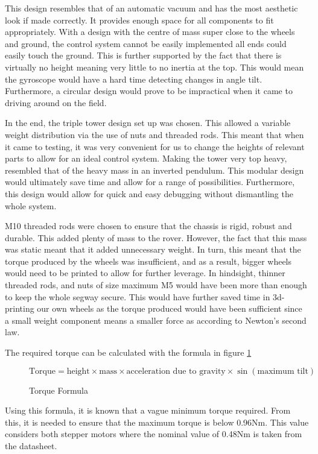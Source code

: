 
This design resembles that of an automatic vacuum and has the most aesthetic look if made correctly. It provides enough space for all components to fit appropriately. With a design with the centre of mass super close to the wheels and ground, the control system cannot be easily implemented all ends could easily touch the ground. This is further supported by the fact that there is virtually no height meaning very little to no inertia at the top. This would mean the gyroscope would have a hard time detecting changes in angle tilt. Furthermore, a circular design would prove to be impractical when it came to driving around on the field.


In the end, the triple tower design set up was chosen. This allowed a variable weight distribution via the use of nuts and threaded rods. This meant that when it came to testing, it was very convenient for us to change the heights of relevant parts to allow for an ideal control system. Making the tower very top heavy, resembled that of the heavy mass in an inverted pendulum. This modular design would ultimately save time and allow for a range of possibilities. Furthermore, this design would allow for quick and easy debugging without dismantling the whole system. 

M10 threaded rods were chosen to ensure that the chassis is rigid, robust and durable. This added plenty of mass to the rover. However, the fact that this mass was static meant that it added unnecessary weight. In turn, this meant that the torque produced by the wheels was insufficient, and as a result, bigger wheels would need to be printed to allow for further leverage. In hindsight, thinner threaded rods, and nuts of size maximum M5 would have been more than enough to keep the whole segway secure. This would have further saved time in 3d-printing our own wheels as the torque produced would have been sufficient since a small weight component means a smaller force as according to Newton’s second law.

The required torque can be calculated with the formula in figure \ref{formula:torque}

\begin{figure}
    \centering
    \(\text{Torque} = \text{height} \times \text{mass} \times \text{acceleration due to gravity} \times \sin (\text{maximum tilt})\)
    \caption{Torque Formula}
    \label{formula:torque}
\end{figure}
Using this formula, it is known that a vague minimum torque required. From this, it is needed to ensure that the maximum torque is below 0.96Nm. This value considers both stepper motors where the nominal value of 0.48Nm is taken from the datasheet. 


